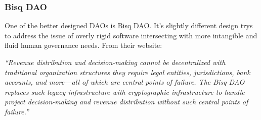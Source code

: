 \subsubsection{Bisq DAO}
One of the better designed DAOs is \href{https://bisq.network/dao/}{Bisq DAO}. It's slightly different design trys to address the issue of overly rigid software intersecting with more intangible and fluid human governance needs. From their website:\par
\textit{``Revenue distribution and decision-making cannot be decentralized with traditional organization structures they require legal entities, jurisdictions, bank accounts, and more—all of which are central points of failure.
The Bisq DAO replaces such legacy infrastructure with cryptographic infrastructure to handle project decision-making and revenue distribution without such central points of failure.''}

